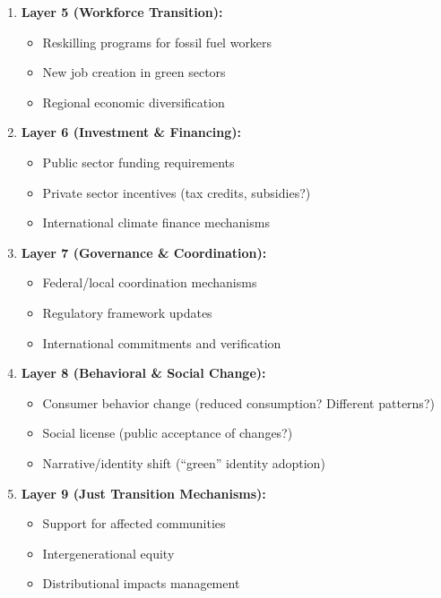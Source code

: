 \documentclass[11pt, a4paper]{article}
\begin{document}
\begin{tcolorbox}[colback=gray!5!white, colframe=gray!75!black, title=Example: National Climate Neutrality (e.g., Carbon Reduction Transformation)]
\begin{enumerate}
    \item \textbf{Layer 5 (Workforce Transition):}
    \begin{itemize}[nosep]
        \item Reskilling programs for fossil fuel workers
        \item New job creation in green sectors
        \item Regional economic diversification
    \end{itemize}

    \item \textbf{Layer 6 (Investment \& Financing):}
    \begin{itemize}[nosep]
        \item Public sector funding requirements
        \item Private sector incentives (tax credits, subsidies?)
        \item International climate finance mechanisms
    \end{itemize}

    \item \textbf{Layer 7 (Governance \& Coordination):}
    \begin{itemize}[nosep]
        \item Federal/local coordination mechanisms
        \item Regulatory framework updates
        \item International commitments and verification
    \end{itemize}

    \item \textbf{Layer 8 (Behavioral \& Social Change):}
    \begin{itemize}[nosep]
        \item Consumer behavior change (reduced consumption? Different patterns?)
        \item Social license (public acceptance of changes?)
        \item Narrative/identity shift (``green'' identity adoption)
    \end{itemize}

    \item \textbf{Layer 9 (Just Transition Mechanisms):}
    \begin{itemize}[nosep]
        \item Support for affected communities
        \item Intergenerational equity
        \item Distributional impacts management
    \end{itemize}


\end{enumerate}
\end{tcolorbox}
\end{document}
